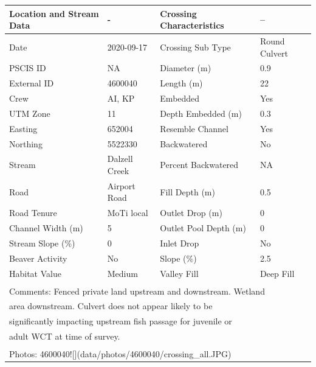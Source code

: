 \documentclass[
]{book}
\begin{document}
\begin{tabular}{l|l|l|l}
\hline
Location and Stream Data & - & Crossing Characteristics & --\\
\hline
Date & 2020-09-17 & Crossing Sub Type & Round Culvert\\
\hline
PSCIS ID & NA & Diameter (m) & 0.9\\
\hline
External ID & 4600040 & Length (m) & 22\\
\hline
Crew & AI, KP & Embedded & Yes\\
\hline
UTM Zone & 11 & Depth Embedded (m) & 0.3\\
\hline
Easting & 652004 & Resemble Channel & Yes\\
\hline
Northing & 5522330 & Backwatered & No\\
\hline
Stream & Dalzell Creek & Percent Backwatered & NA\\
\hline
Road & Airport Road & Fill Depth (m) & 0.5\\
\hline
Road Tenure & MoTi local & Outlet Drop (m) & 0\\
\hline
Channel Width (m) & 5 & Outlet Pool Depth (m) & 0\\
\hline
Stream Slope (\%) & 0 & Inlet Drop & No\\
\hline
Beaver Activity & No & Slope (\%) & 2.5\\
\hline
Habitat Value & Medium & Valley Fill & Deep Fill\\
\hline
\multicolumn{4}{l}{\textsuperscript{} Comments: Fenced private land upstream and downstream. Wetland}\\
\multicolumn{4}{l}{area downstream.  Culvert does not appear likely to be}\\
\multicolumn{4}{l}{significantly impacting upstream fish passage for juvenile or}\\
\multicolumn{4}{l}{adult WCT at time of survey.}\\
\multicolumn{4}{l}{\textsuperscript{} Photos: 4600040![](data/photos/4600040/crossing\_all.JPG)}\\
\end{tabular}
\end{document}
